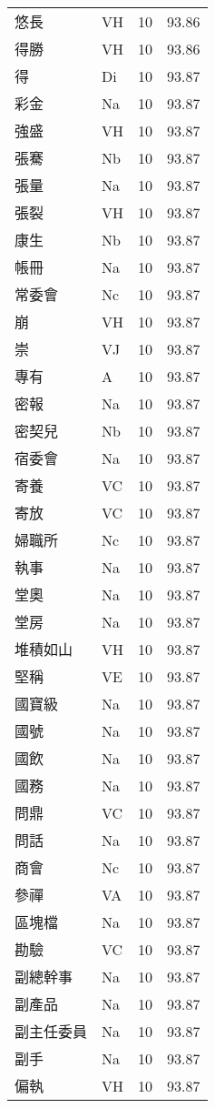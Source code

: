 \documentclass[twocolumn]{book}
\begin{document}
\begin{supertabular}{llrr}
悠長 & VH & 10 &  93.86\\
得勝 & VH & 10 &  93.86\\
得 & Di & 10 &  93.87\\
彩金 & Na & 10 &  93.87\\
強盛 & VH & 10 &  93.87\\
張騫 & Nb & 10 &  93.87\\
張量 & Na & 10 &  93.87\\
張裂 & VH & 10 &  93.87\\
康生 & Nb & 10 &  93.87\\
帳冊 & Na & 10 &  93.87\\
常委會 & Nc & 10 &  93.87\\
崩 & VH & 10 &  93.87\\
崇 & VJ & 10 &  93.87\\
專有 & A & 10 &  93.87\\
密報 & Na & 10 &  93.87\\
密契兒 & Nb & 10 &  93.87\\
宿委會 & Na & 10 &  93.87\\
寄養 & VC & 10 &  93.87\\
寄放 & VC & 10 &  93.87\\
婦職所 & Nc & 10 &  93.87\\
執事 & Na & 10 &  93.87\\
堂奧 & Na & 10 &  93.87\\
堂房 & Na & 10 &  93.87\\
堆積如山 & VH & 10 &  93.87\\
堅稱 & VE & 10 &  93.87\\
國寶級 & Na & 10 &  93.87\\
國號 & Na & 10 &  93.87\\
國飲 & Na & 10 &  93.87\\
國務 & Na & 10 &  93.87\\
問鼎 & VC & 10 &  93.87\\
問話 & Na & 10 &  93.87\\
商會 & Nc & 10 &  93.87\\
參禪 & VA & 10 &  93.87\\
區塊檔 & Na & 10 &  93.87\\
勘驗 & VC & 10 &  93.87\\
副總幹事 & Na & 10 &  93.87\\
副產品 & Na & 10 &  93.87\\
副主任委員 & Na & 10 &  93.87\\
副手 & Na & 10 &  93.87\\
偏執 & VH & 10 &  93.87\\

\end{supertabular}
\end{document}
